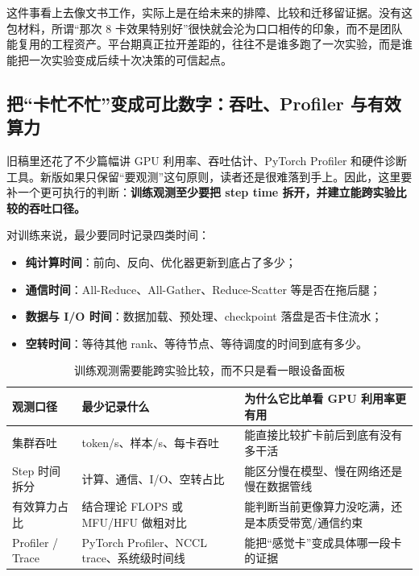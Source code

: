 这件事看上去像文书工作，实际上是在给未来的排障、比较和迁移留证据。没有这包材料，所谓“那次 8 卡效果特别好”很快就会沦为口口相传的印象，而不是团队能复用的工程资产。平台期真正拉开差距的，往往不是谁多跑了一次实验，而是谁能把一次实验变成后续十次决策的可信起点。

\subsection{把“卡忙不忙”变成可比数字：吞吐、Profiler 与有效算力}
旧稿里还花了不少篇幅讲 GPU 利用率、吞吐估计、PyTorch Profiler 和硬件诊断工具。新版如果只保留“要观测”这句原则，读者还是很难落到手上。因此，这里要补一个更可执行的判断：\textbf{训练观测至少要把 step time 拆开，并建立能跨实验比较的吞吐口径。}

对训练来说，最少要同时记录四类时间：
\begin{itemize}
  \item \textbf{纯计算时间}：前向、反向、优化器更新到底占了多少；
  \item \textbf{通信时间}：All-Reduce、All-Gather、Reduce-Scatter 等是否在拖后腿；
  \item \textbf{数据与 I/O 时间}：数据加载、预处理、checkpoint 落盘是否卡住流水；
  \item \textbf{空转时间}：等待其他 rank、等待节点、等待调度的时间到底有多少。
\end{itemize}

\begin{table}[H]
\centering
\small
\begin{tabularx}{\textwidth}{>{\raggedright\arraybackslash}p{2.8cm}>{\raggedright\arraybackslash}p{3.1cm}>{\raggedright\arraybackslash}X}
\toprule
\textbf{观测口径} & \textbf{最少记录什么} & \textbf{为什么它比单看 GPU 利用率更有用} \\
\midrule
集群吞吐 & token/s、样本/s、每卡吞吐 & 能直接比较扩卡前后到底有没有多干活 \\
Step 时间拆分 & 计算、通信、I/O、空转占比 & 能区分慢在模型、慢在网络还是慢在数据管线 \\
有效算力占比 & 结合理论 FLOPS 或 MFU/HFU 做粗对比 & 能判断当前更像算力没吃满，还是本质受带宽/通信约束 \\
Profiler / Trace & PyTorch Profiler、NCCL trace、系统级时间线 & 能把“感觉卡”变成具体哪一段卡的证据 \\
\bottomrule
\end{tabularx}
\caption{训练观测需要能跨实验比较，而不只是看一眼设备面板}
\label{tab:training-observability}
\end{table}


